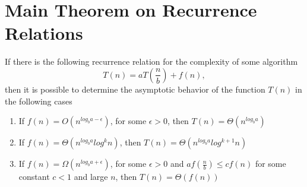 \section{Main Theorem on Recurrence Relations}

\begin{theorem}
\label{addAlgoMasterTheorem}
If there is the following recurrence relation for the complexity
of some algorithm
\[
T\left( n \right ) = a T \left( \frac{n}{b} \right) + f\left( n \right ),
\]
then it is possible to determine the asymptotic behavior of the function 
$T\left( n\right ) $ in the following cases
\begin{enumerate}
\item If $f\left(n\right) = O\left( n^{log_ba - \epsilon}\right)$,
  for some $\epsilon > 0$, then 
$T\left(n\right) = \Theta\left(n^{log_ba}\right)$
\item If 
$f\left(n\right) = \Theta\left( n^{log_ba}log^{k}n\right)$, then 
$T\left(n\right) = \Theta\left(n^{log_ba}log^{k + 1}n\right)$
\item If $f\left(n\right) = \Omega\left( n^{log_ba + \epsilon}\right)$,
  for some $\epsilon > 0$ and $a f\left(\frac{n}{b}\right) \le c f
  \left( n \right)$ for some constant $c < 1$ and large $n$, then 
$T\left(n\right) = \Theta\left(f\left(n\right)\right)$
\end{enumerate}
\end{theorem}
